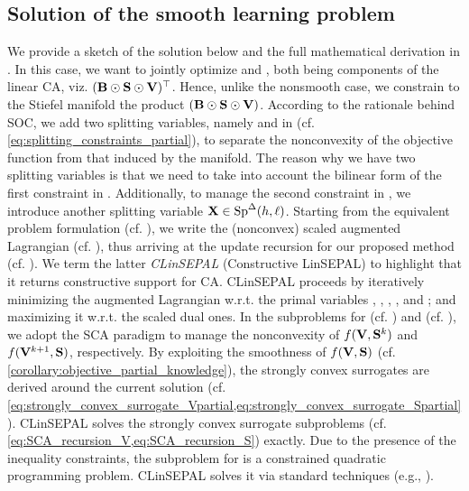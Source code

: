 \subsection{Solution of the smooth learning problem}\label{subsec:sol_smooth}
We provide a sketch of the solution below and the full mathematical derivation in .
In this case, we want to jointly optimize \Supp and \V, both being components of the linear CA, viz. $(\mathbf{B} \odot \mathbf{S} \odot \mathbf{V})^\top$.
Hence, unlike the nonsmooth case, we constrain to the Stiefel manifold the product $(\mathbf{B} \odot \mathbf{S} \odot \mathbf{V})$. 
According to the rationale behind SOC, we add two splitting variables, namely \YO and \YT in  (cf. \cref{eq:splitting_constraints_partial}), to separate the nonconvexity of the objective function from that induced by the manifold.
The reason why we have two splitting variables is that we need to take into account the bilinear form of the first constraint in .
Additionally, to manage the second constraint in , we introduce another splitting variable $\mathbf{X} \in \mathrm{Sp}^{\Delta}({h},{\ell})$.
Starting from the equivalent problem formulation (cf. ), we write the (nonconvex) scaled augmented Lagrangian (cf. ), thus arriving at the update recursion for our proposed method (cf. ).
We term the latter \emph{CLinSEPAL} (Constructive LinSEPAL) to highlight that it returns constructive support for CA.
CLinSEPAL proceeds by iteratively minimizing the augmented Lagrangian w.r.t. the primal variables \V, \Supp, \YO, \YT, and \X; and maximizing it w.r.t. the scaled dual ones.
In the subproblems for \V (cf. ) and \Supp (cf. ), we adopt the SCA paradigm to manage the nonconvexity of $f(\mathbf{V},\mathbf{S}^k)$ and $f(\mathbf{V}^{k+1},\mathbf{S})$, respectively.
By exploiting the smoothness of $f(\mathbf{V},\mathbf{S})$ (cf. \cref{corollary:objective_partial_knowledge}), the strongly convex surrogates are derived around the current solution (cf. \cref{eq:strongly_convex_surrogate_Vpartial,eq:strongly_convex_surrogate_Spartial}).
CLinSEPAL solves the strongly convex surrogate subproblems (cf. \cref{eq:SCA_recursion_V,eq:SCA_recursion_S}) exactly.
Due to the presence of the inequality constraints, the subproblem for \Supp is a constrained quadratic programming problem.
CLinSEPAL solves it via standard techniques (e.g., \citealp{osqp}).

